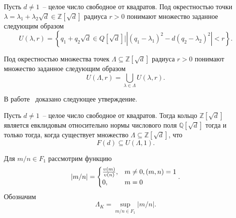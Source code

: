 \documentclass[_00_dissertation.tex]{subfiles}
\begin{document}
\begin{definition}
    Пусть $d \neq 1$~-- целое число свободное от квадратов.
    Под окрестностью точки $\lambda = \lambda_1 + \lambda_2 \sqrt{d} \in \mathbb{Z}[\sqrt{d}]$ радиуса $r > 0$ понимают множество заданное следующим образом
    \begin{equation*}
        U(\lambda, r) = \left\{
            q_1 + q_2 \sqrt{d} \in Q[\sqrt{d}] \big| |(q_1 - \lambda_1)^2 - d(q_2 - \lambda_2)^2| < r
        \right\}.
    \end{equation*}

    Под окрестностью множества точек $\Lambda \subseteq \mathbb{Z}[\sqrt{d}]$ радиуса $r > 0$ понимают множество заданное следующим образом
    \begin{equation*}
        U(\Lambda, r) = \bigcup_{\lambda \in \Lambda} U(\lambda, r).
    \end{equation*}
\end{definition}

В работе~\cite{source:Selfridge} доказано следующее утверждение.

\begin{statement}\label{proposition:fundamental_in_circle}
    Пусть $d \neq 1$~-- целое число свободное от квадратов.
    Тогда кольцо $\mathbb{Z}[\sqrt{d}]$ является евклидовым относительно нормы числового поля $\mathbb{Q}[\sqrt{d}]$ тогда и только тогда, когда существует множество $\Lambda \subseteq \mathbb{Z}[\sqrt{d}]$, что
    \begin{equation*}
        F(d) \subseteq U(\Lambda, 1).
    \end{equation*}
\end{statement}

\begin{definition}\label{definition:euclidean_lambda}
    Для $m/n \in F_1$ рассмотрим функцию
    \begin{equation*}
        |m/n| = \begin{cases}
            \frac{\upsilon(m)}{\upsilon(n)}, & m \neq 0, (m, n) = 1\\
            0, & m = 0
        \end{cases}.
    \end{equation*}
    Обозначим
    \begin{equation*}
        \Lambda_K = \sup_{m/n \in F_1} |m/n|.
    \end{equation*}
\end{definition}
\end{document}
